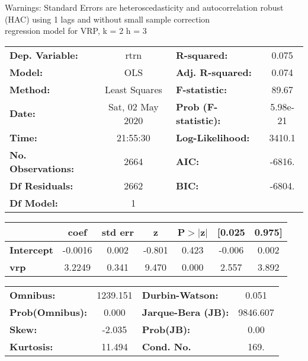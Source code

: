 Warnings: \newline
 [1] Standard Errors are heteroscedasticity and autocorrelation robust (HAC) using 1 lags and without small sample correction\\ 

regression model for VRP, k = 2 h = 3\begin{center}
\begin{tabular}{lclc}
\toprule
\textbf{Dep. Variable:}    &       rtrn       & \textbf{  R-squared:         } &     0.075   \\
\textbf{Model:}            &       OLS        & \textbf{  Adj. R-squared:    } &     0.074   \\
\textbf{Method:}           &  Least Squares   & \textbf{  F-statistic:       } &     89.67   \\
\textbf{Date:}             & Sat, 02 May 2020 & \textbf{  Prob (F-statistic):} &  5.98e-21   \\
\textbf{Time:}             &     21:55:30     & \textbf{  Log-Likelihood:    } &    3410.1   \\
\textbf{No. Observations:} &        2664      & \textbf{  AIC:               } &    -6816.   \\
\textbf{Df Residuals:}     &        2662      & \textbf{  BIC:               } &    -6804.   \\
\textbf{Df Model:}         &           1      & \textbf{                     } &             \\
\bottomrule
\end{tabular}
\begin{tabular}{lcccccc}
                   & \textbf{coef} & \textbf{std err} & \textbf{z} & \textbf{P$> |$z$|$} & \textbf{[0.025} & \textbf{0.975]}  \\
\midrule
\textbf{Intercept} &      -0.0016  &        0.002     &    -0.801  &         0.423        &       -0.006    &        0.002     \\
\textbf{vrp}       &       3.2249  &        0.341     &     9.470  &         0.000        &        2.557    &        3.892     \\
\bottomrule
\end{tabular}
\begin{tabular}{lclc}
\textbf{Omnibus:}       & 1239.151 & \textbf{  Durbin-Watson:     } &    0.051  \\
\textbf{Prob(Omnibus):} &   0.000  & \textbf{  Jarque-Bera (JB):  } & 9846.607  \\
\textbf{Skew:}          &  -2.035  & \textbf{  Prob(JB):          } &     0.00  \\
\textbf{Kurtosis:}      &  11.494  & \textbf{  Cond. No.          } &     169.  \\
\bottomrule
\end{tabular}
\end{center}

